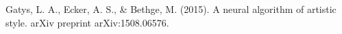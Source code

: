 \documentclass[9pt]{beamer}
\begin{document}
\begin{frame}
\begin{center}
  \end{center}

  \bigskip

  {\footnotesize Gatys, L. A., Ecker, A. S., \& Bethge, M. (2015). A
    neural algorithm of artistic style. arXiv preprint
    arXiv:1508.06576.}
\end{frame}
\end{document}

